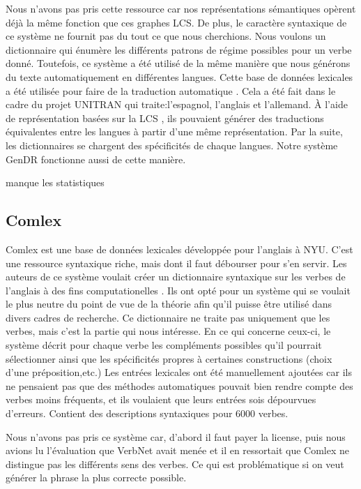 Nous n'avons pas pris cette ressource car nos représentations sémantiques opèrent déjà la même fonction que ces graphes LCS. De plus, le caractère syntaxique de ce système ne fournit pas du tout ce que nous cherchions. Nous voulons un dictionnaire qui énumère les différents patrons de régime possibles pour un verbe donné. Toutefois, ce système a été utilisé de la même manière que nous générons du texte automatiquement en différentes langues. Cette base de données lexicales a été utilisée pour faire de la traduction automatique \citep{DorrUseLexicalSemantics1992}. Cela a été fait dans le cadre du projet UNITRAN qui traite:l'espagnol, l'anglais et l'allemand. À l'aide de représentation basées sur la LCS , ils pouvaient générer des traductions équivalentes entre les langues à partir d'une même représentation. Par la suite, les dictionnaires se chargent des spécificités de chaque langues. Notre système GenDR fonctionne aussi de cette manière.

manque les statistiques

\subsection{Comlex}
Comlex est une base de données lexicales développée pour l'anglais à NYU. C'est une ressource syntaxique riche, mais dont il faut débourser pour s'en servir. Les auteurs de ce système voulait  créer un dictionnaire syntaxique sur les verbes de l'anglais à des fins computationelles \citep{Grishman:1994:CSB:991886.991931}. Ils ont opté pour un système qui se voulait le plus neutre du point de vue de la théorie afin qu'il puisse être utilisé dans divers cadres de recherche. Ce dictionnaire ne traite pas uniquement que les verbes, mais c'est la partie qui nous intéresse. En ce qui concerne ceux-ci, le système décrit pour chaque verbe les compléments possibles qu'il pourrait sélectionner ainsi que les spécificités propres à certaines constructions (choix d'une préposition,etc.) Les entrées lexicales ont été manuellement ajoutées car ils ne pensaient pas que des méthodes automatiques pouvait bien rendre compte des verbes moins fréquents, et ils voulaient que leurs entrées sois dépourvues d'erreurs. Contient des descriptions syntaxiques pour 6000 verbes. 

Nous n'avons pas pris ce système car, d'abord il faut payer la license, puis nous avions lu l'évaluation que VerbNet avait menée et il en ressortait que Comlex ne distingue pas les  différents sens des verbes. Ce qui est problématique si on veut générer la phrase la plus correcte possible.

